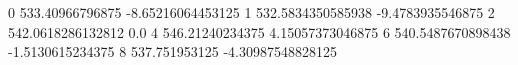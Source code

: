 0 533.40966796875 -8.65216064453125
1 532.5834350585938 -9.4783935546875
2 542.0618286132812 0.0
4 546.21240234375 4.15057373046875
6 540.5487670898438 -1.5130615234375
8 537.751953125 -4.30987548828125
